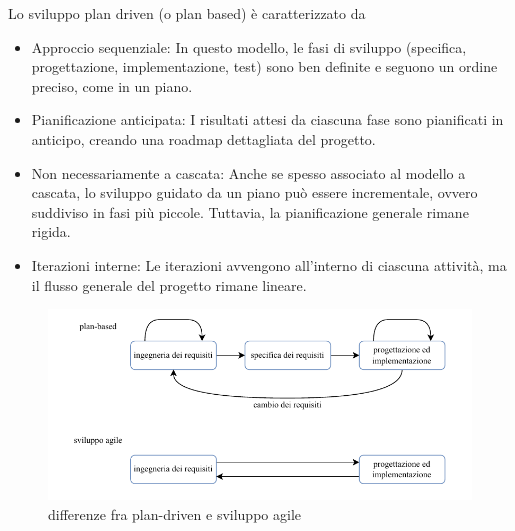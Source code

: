 \documentclass[10pt, letterpaper]{report}
\begin{document}
Lo sviluppo plan driven (o plan based) è caratterizzato da\begin{itemize}
    \item Approccio sequenziale: In questo modello, le fasi di sviluppo (specifica, progettazione, implementazione, test) sono ben definite e seguono un ordine preciso, come in un piano.
    \item Pianificazione anticipata: I risultati attesi da ciascuna fase sono pianificati in anticipo, creando una roadmap dettagliata del progetto.
    \item Non necessariamente a cascata: Anche se spesso associato al modello a cascata, lo sviluppo guidato da un piano può essere incrementale, ovvero suddiviso in fasi più piccole. Tuttavia, la pianificazione generale rimane rigida.
    \item Iterazioni interne: Le iterazioni avvengono all'interno di ciascuna attività, ma il flusso generale del progetto rimane lineare.
\end{itemize}
\begin{figure}[h!]
    \centering 
    \includegraphics[width=1\textwidth ]{images/agile.pdf}
    \caption{differenze fra plan-driven e sviluppo agile}
\end{figure}
\flowerLine 
\end{document}

